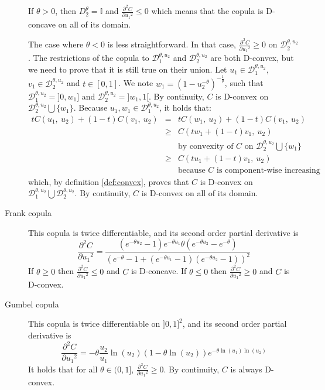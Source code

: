\begin{description}
If $\theta>0$, then $D^\theta_2=\mathbb{I}$ and $\frac{\partial^2 C}{\partial {u_1}^2}\leqslant0$ which means that the copula is D-concave on all of its domain.

The case where $\theta<0$ is less straightforward. In that case, $\frac{\partial^2 C}{\partial {u_1}^2}\geqslant0$ on $\mathcal{D}_2^{\theta,u_2}$. The restrictions of the copula to $\mathcal{D}_1^{\theta,u_2}$ and $\mathcal{D}_2^{\theta,u_2}$ are both D-convex, but we need to prove that it is still true on their union. Let $u_1\in\mathcal{D}_1^{\theta,u_2}$, $v_1\in\mathcal{D}_2^{\theta,u_2}$ and $t\in[0,1]$. We note $w_1=(1-u_2^{-\theta})^{-\frac{1}{\theta}}$, such that $\mathcal{D}_1^{\theta,u_2}=]0,w_1]$ and $\mathcal{D}_2^{\theta,u_2}=]w_1, 1[$. By continuity, $C$ is D-convex on $\mathcal{D}_2^{\theta,u_2}\bigcup\{w_1\}$. Because $u_1,w_1\in \mathcal{D}_1^{\theta,u_2}$, it holds that:
    \begin{eqnarray*}
        tC(u_1,~u_2)+(1-t)C(v_1,~u_2) &=& tC(w_1,~u_2)+(1-t)C(v_1,~u_2)\\
        &\geqslant& C(tw_1+(1-t)v_1,~u_2)\\
        &&\text{by convexity of $C$ on $\mathcal{D}_2^{\theta,u_2}\bigcup\{w_1\}$}\\
        &\geqslant& C(tu_1+(1-t)v_1,~u_2)\\
        && \text{because $C$ is component-wise increasing}
    \end{eqnarray*}
which, by definition \ref{def:convex}, proves that $C$ is D-convex on $\mathcal{D}_1^{\theta,u_2}\bigcup \mathcal{D}_2^{\theta,u_2}$. By continuity, $C$ is D-convex on all of its domain.
\item[Frank copula] This copula is twice differentiable, and its second order partial derivative is
$$\frac{\partial^2 C}{\partial {u_1}^2}=\frac{(e^{-\theta u_2}-1)e^{-\theta u_1}\theta(e^{-\theta u_2}-e^{-\theta} )}{(e^{-\theta}-1+(e^{-\theta u_1}-1)(e^{-\theta u_2}-1))^2}$$
If $\theta\geqslant0$ then $\frac{\partial^2 C}{\partial {u_1}^2}\leqslant 0$ and $C$ is D-concave. If $\theta\leqslant0$ then $\frac{\partial^2 C}{\partial {u_1}^2}\geqslant 0$ and $C$ is D-convex.
\item[Gumbel copula] This copula is twice differentiable on $]0,1]^2$, and its second order partial derivative is
$$\frac{\partial^2 C}{\partial {u_1}^2}=-\theta\frac{u_2}{u_1}\ln(u_2)(1-\theta\ln(u_2))e^{-\theta\ln(u_1)\ln(u_2)}$$
It holds that for all $\theta\in(0,1]$, $\frac{\partial^2 C}{\partial {u_1}^2}\geqslant0$. By continuity, $C$ is always D-convex.
\end{description}

